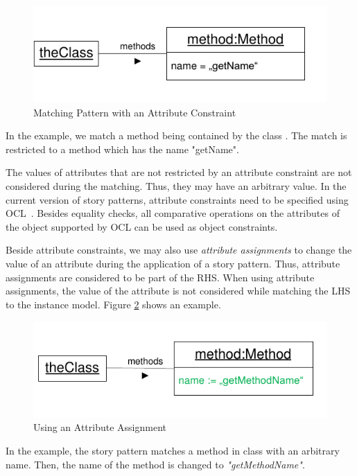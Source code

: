 \begin{figure}[htbp]
  \centering
  \includegraphics[scale=1]{figures/ObjectConstraint}
  \caption{Matching Pattern with an Attribute Constraint}
  \label{fig:objectConstraint}
\end{figure}

In the example, we match a method being contained by the class . 
The match is restricted to a method which has the name "getName".

The values of attributes that are not restricted by an attribute constraint are not considered during the matching. 
Thus, they may have an arbitrary value. 
In the current version of story patterns, attribute constraints need to be specified using OCL~\cite{OCL}. 
Besides equality checks, all comparative operations on the attributes of the object supported by OCL can be used as object constraints. 

Beside attribute constraints, we may also use \emph{attribute assignments} to change the value of an attribute during the application of a story pattern. 
Thus, attribute assignments are considered to be part of the RHS. 
When using attribute assignments, the value of the attribute is not considered while matching the LHS to the instance model. 
Figure \ref{fig:attributeAssignment} shows an example.

\begin{figure}[htbp]
  \centering
  \includegraphics[scale=1]{figures/AttributeAssignment}
  \caption{Using an Attribute Assignment}
  \label{fig:attributeAssignment}
\end{figure}

In the example, the story pattern matches a method in class  with an arbitrary name. 
Then, the name of the method is changed to \emph{"getMethodName"}. 

